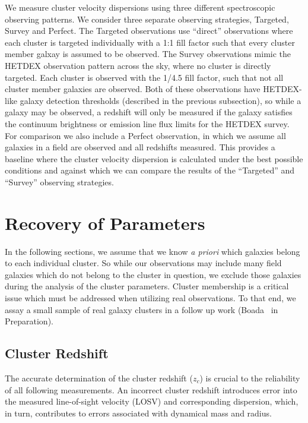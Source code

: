 \documentclass[fleqn,usenatbib]{mnras}
\begin{document}
We measure cluster velocity dispersions using three different spectroscopic observing patterns. We consider three separate observing strategies, Targeted, Survey and Perfect. The Targeted observations use ``direct'' observations where each cluster is targeted individually with a 1:1 fill factor such that every cluster member galxay is assumed to be observed. The Survey observations mimic the HETDEX observation pattern across the sky, where no cluster is directly targeted. Each cluster is observed with the 1/4.5 fill factor, such that not all cluster member galaxies are observed. Both of these observations have HETDEX-like galaxy detection thresholds (described in the previous subsection), so while a galaxy may be observed, a redshift will only be measured if the galaxy satisfies the continuum brightness or emission line flux limits for the HETDEX survey. For comparison we also include a Perfect observation, in which we assume all galaxies in a field are observed and all redshifts measured. This provides a baseline where the cluster velocity dispersion is calculated under the best possible conditions and against which we can compare the results of the ``Targeted'' and ``Survey'' observing strategies.

\section{Recovery of Parameters}\label{sec:recovery}
In the following sections, we assume that we know \textit{a priori} which galaxies belong to each individual cluster. So while our observations may include many field galaxies which do not belong to the cluster in question, we exclude those galaxies during the analysis of the cluster parameters. Cluster membership is a critical issue which must be addressed when utilizing real observations. To that end, we assay a small sample of real galaxy clusters in a follow up work (Boada \etal\ in Preparation).

\subsection{Cluster Redshift}
The accurate determination of the cluster redshift ($z_c$) is crucial to the reliability of all following measurements. An incorrect cluster redshift introduces error into the measured line-of-sight velocity (LOSV) and corresponding dispersion, which, in turn, contributes to errors associated with dynamical mass and radius. 
\end{document}

